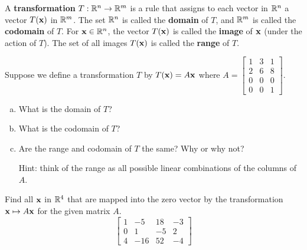 \begin{boxdef}
	A \textbf{transformation} $T:\mathbb{R}^n\to\mathbb{R}^m$ is a rule that assigns to each vector in $\mathbb{R}^n$ a vector $T(\boldsymbol{\mathbf{x}})$ in $\mathbb{R}^m$. The set $\mathbb{R}^n$ is called the \textbf{domain} of $T$, and $\mathbb{R}^m$ is called the \textbf{codomain} of $T$. For $\boldsymbol{\mathbf{x}}\in\mathbb{R}^n$, the vector $T(\boldsymbol{\mathbf{x}})$ is called the \textbf{image} of $\boldsymbol{\mathbf{x}}$ (under the action of $T$). The set of all images $T(\boldsymbol{\mathbf{x}})$ is called the \textbf{range} of $T$.
\end{boxdef}

\begin{exercise} %
	Suppose we define a transformation $T$ by $T(\boldsymbol{\mathbf{x}})=A\boldsymbol{\mathbf{x}}$ where $A=\begin{bmatrix}1&3&1\\2&6&8\\0&0&0\\0&0&1\end{bmatrix}$.
	\begin{enumerate}[(a)]
		\item What is the domain of $T$?
		\vspace{1em}
		\item What is the codomain of $T$?
		\vspace{1em}
		\item Are the range and codomain of $T$ the same? Why or why not? \par
		Hint: think of the range as all possible linear combinations of the columns of $A$.
	\end{enumerate}
\end{exercise}
\vfill



\begin{exercise} %
	Find all $\boldsymbol{\mathbf{x}}$ in $\mathbb{R}^4$ that are mapped into the zero vector by the transformation $\boldsymbol{\mathbf{x}}\mapsto A\boldsymbol{\mathbf{x}}$ for the given matrix $A$.
	$$ \begin{bmatrix} 1&-5&18&-3 \\ 0&1&-5&2 \\ 4&-16&52&-4 \end{bmatrix}$$
\end{exercise}
\vfill


